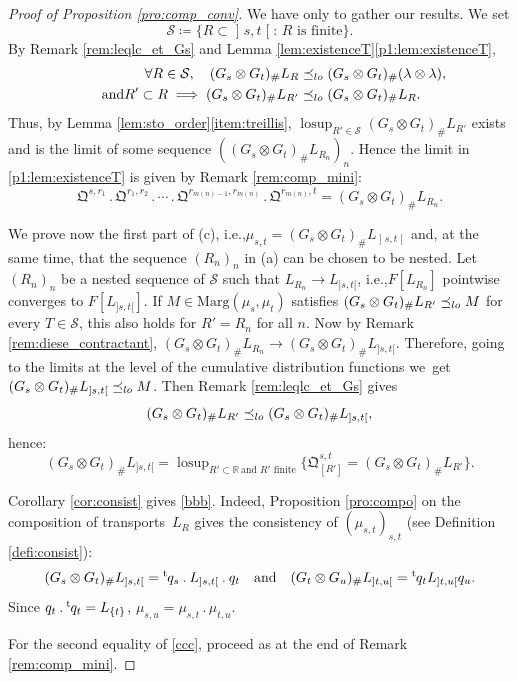 \documentclass[11pt]{article}
\newcommand{\ie}{i.e.,\xspace}
\newcommand{\ldot}{\mathbin{.}}
\newcommand{\lcdots}{\ldot\cdots\ldot}
\theoremstyle{plain}
\theoremstyle{definition}
\newcommand{\como}{\mathfrak{Q}}
\newcommand{\trans}{{}^{\mathrm{t}}\mkern-1mu}
\newcommand{\eqdef}{\coloneqq}
\newcommand{\la}{\lambda}
\newcommand{\ma}{\mathrm{Marg}}
\newcommand{\R}{\mathbb{R}}
\newcommand{\AND}{\quad\text{and}\quad}
\newcommand{\lcsup}{\operatorname{losup}}
\newcommand{\op}{\mathopen}
\newcommand{\clo}{\mathclose}
\newcommand{\leqlc}{\preceq_{\rm lo}}
\begin{document}
\begin{proof}[Proof of Proposition \ref{pro:comp_conv}] We have only to gather our results. We set
\[
\mathcal{S}\eqdef\{R\subset \op]s,t\clo[:\,R\text{ is finite}\}.
\]
By Remark \ref{rem:leqlc_et_Gs} and Lemma \ref{lem:existenceT}\eqref{p1:lem:existenceT},
\begin{align*}
\forall R\in\mathcal{S},\quad (G_s\otimes G_t)_\#L_R&\leqlc (G_s\otimes G_t)_\#(\la\otimes \la),\\
\tag*{and}
R'\subset R\implies(G_s\otimes G_t)_\#L_{R'}&\leqlc (G_s\otimes G_t)_\#L_{R}. 
\end{align*}
Thus, by Lemma \ref{lem:sto_order}\eqref{item:treillis}, $\lcsup_{R'\in\mathcal{S}}(G_s\otimes G_t)_\#L_{R'}$ exists and is the limit of some sequence $((G_s\otimes G_t)_\#L_{R_n})_n$. Hence the limit in \eqref{p1:lem:existenceT} is given by Remark \ref{rem:comp_mini}:
\[\como^{s,r_1}{}\ldot\como^{r_1,r_2}\lcdots \como^{r_{m(n)-1},r_{m(n)}}{}\ldot\como^{r_{m(n)},t}=(G_s\otimes G_t)_\#L_{R_n}.\]

We prove now the first part of (c), \ie $\mu_{s,t}=(G_s\otimes G_t)_\#L_{\op]s,t\clo[}$ and, at the same time, that the sequence $(R_n)_n$ in (a) can be chosen to be nested. Let $(R_n)_n$ be a nested sequence of $\mathcal{S}$ such that $L_{R_n}\to L_{]s,t[}$, \ie $F[L_{R_n}]$ pointwise converges to $F[L_{]s,t[}]$. If $M\in \ma(\mu_s,\mu_t)$ satisfies $(G_s\otimes G_t)_\#L_{R'}\leqlc M$ for every $T\in \mathcal{S}$, this also holds for $R'=R_n$ for all $n$. Now by Remark \ref{rem:diese_contractant}, $(G_s\otimes G_t)_\#L_{R_n}\to (G_s\otimes G_t)_\#L_{]s,t[}$. Therefore, going to the limits at the level of the cumulative distribution functions we~get $(G_s\otimes G_t)_\#L_{]s,t[}\leqlc M$. Then Remark \ref{rem:leqlc_et_Gs} gives
\[
(G_s\otimes G_t)_\#L_{R'}\leqlc(G_s\otimes G_t)_\#L_{]s,t[},
\]
hence:
\[(G_s\otimes G_t)_\#L_{]s,t[}=\lcsup_{R'\subset\R\ \text{and $R'$ finite}}\bigl\{\como^{s,t}_{[R']}=(G_s\otimes G_t)_\#L_{R'}\bigr\}.\]

Corollary \ref{cor:consist} gives \eqref{bbb}. Indeed, Proposition \ref{pro:compo} on the composition of transports~$L_R$ gives the consistency of $(\mu_{s,t})_{s,t}$ (see Definition \ref{defi:consist}):
\[
(G_s\otimes G_t)_\#L_{\op]s,t\clo[}=\trans{q}_s \ldot L_{\op]s,t\clo[}{}\ldot q_t\AND (G_t\otimes G_u)_\#L_{]t,u[}=\trans{q}_t L_{]t,u[}q_u.
\]
Since $q_t\ldot\trans{q}_t=L_{\{t\}}$, $\mu_{s,u}=\mu_{s,t}{}\ldot\mu_{t,u}$.

For the second equality of \eqref{ccc}, proceed as at the end of Remark \ref{rem:comp_mini}.
\end{proof}
\end{document}
